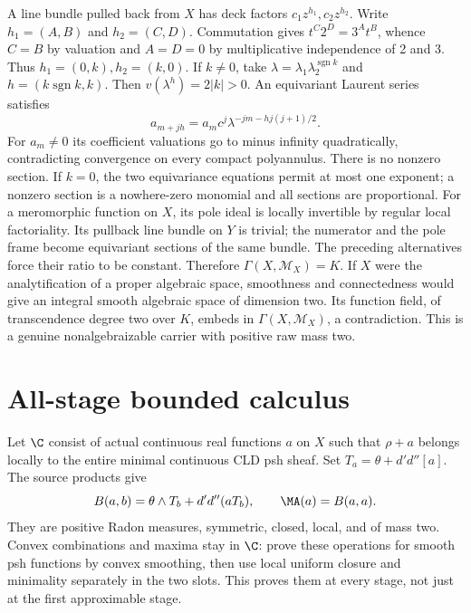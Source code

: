 A line bundle pulled back from $X$ has deck factors $c_1z^{h_1},c_2z^{h_2}$.
Write $h_1=(A,B)$ and $h_2=(C,D)$. Commutation gives
$t^C2^D=3^At^B$, whence $C=B$ by valuation and $A=D=0$ by multiplicative
independence of 2 and 3. Thus $h_1=(0,k),h_2=(k,0)$.
If $k\ne0$, take $\lambda=\lambda_1\lambda_2^{\operatorname{sgn}k}$ and
$h=(k\operatorname{sgn}k,k)$. Then $v(\lambda^h)=2|k|>0$.
An equivariant Laurent series satisfies
\[
 a_{m+jh}=a_m c^j\lambda^{-jm-hj(j+1)/2}.
\]
For $a_m\ne0$ its coefficient valuations go to minus infinity quadratically,
contradicting convergence on every compact polyannulus. There is no nonzero
section. If $k=0$, the two equivariance equations permit at most one exponent;
a nonzero section is a nowhere-zero monomial and all sections are proportional.
For a meromorphic function on $X$, its pole ideal is locally invertible by
regular local factoriality. Its pullback line bundle on $Y$ is trivial; the
numerator and the pole frame become equivariant sections of the same bundle.
The preceding alternatives force their ratio to be constant. Therefore
$\Gamma(X,\mathcal M_X)=K$. If $X$ were the analytification of a proper
algebraic space, smoothness and connectedness would give an integral smooth
algebraic space of dimension two. Its function field, of transcendence degree
two over $K$, embeds in $\Gamma(X,\mathcal M_X)$, a contradiction.
This is a genuine nonalgebraizable carrier with positive raw mass two.

\section{All-stage bounded calculus}
Let $\C$ consist of actual continuous real functions $a$ on $X$ such that
$\rho+a$ belongs locally to the entire minimal continuous CLD psh sheaf.
Set $T_a=\theta+d'd''[a]$. The source products give
\[
 B(a,b)=\theta\wedge T_b+d'd''(aT_b),\qquad
 \MA(a)=B(a,a).
\]
They are positive Radon measures, symmetric, closed, local, and of mass two.
Convex combinations and maxima stay in $\C$: prove these operations for
smooth psh functions by convex smoothing, then use local uniform closure
and minimality separately in the two slots. This proves them at every stage,
not just at the first approximable stage.

